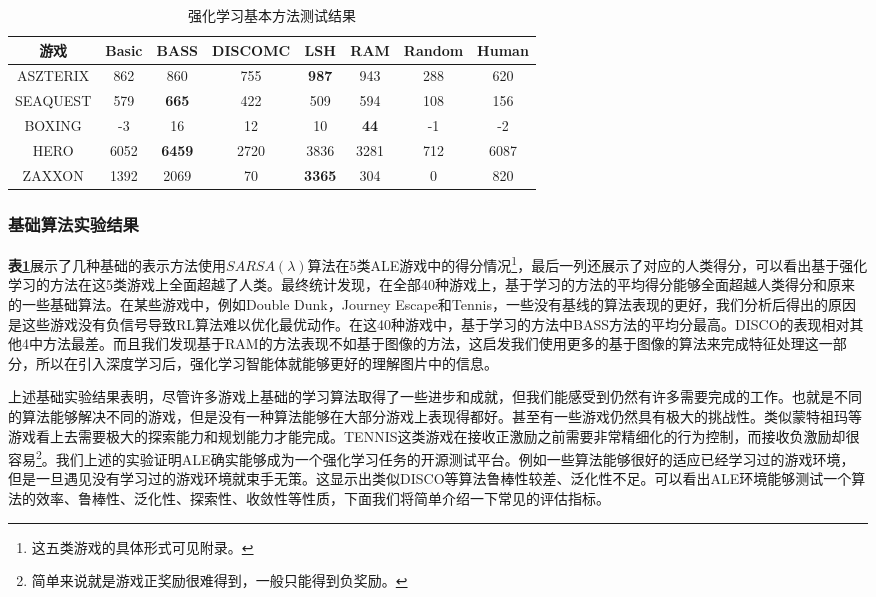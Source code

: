 \begin{table}[!tp]
    \caption{强化学习基本方法测试结果}
    
	\centering
	\begin{tabular}{c||c c c c c || c  c }
    \hline
    游戏&Basic & BASS & DISCOMC&LSH &RAM &Random  & Human\\
    \hline
    ASZTERIX    &   862     & 860        &      755 &\textbf{987}    &943    &288 & 620 \\
    SEAQUEST    &   579     & \textbf{665}        &      422 &509    &594    &108 & 156\\
    BOXING      &     -3    & 16         &      12  &10     &\textbf{44 }    &-1  & -2\\
    HERO        &     6052  & \textbf{6459}       &      2720&3836   &3281   &712 & 6087\\
    ZAXXON      & 1392      & 2069       &      70  &\textbf{3365}   &304    &0   & 820\\
    \hline
    \end{tabular}
    \label{Table: base rl performance on ale}
    
\end{table}



\subsubsection{基础算法实验结果}
\textbf{表\ref{Table: base rl performance on ale}}展示了几种基础的表示方法使用$SARSA(\lambda)$算法在5类ALE游戏中的得分情况\footnote{这五类游戏的具体形式可见附录。}，最后一列还展示了对应的人类得分，可以看出基于强化学习的方法在这5类游戏上全面超越了人类。最终统计发现，在全部40种游戏上，基于学习的方法的平均得分能够全面超越人类得分和原来的一些基础算法。在某些游戏中，例如Double Dunk，Journey Escape和Tennis，一些没有基线的算法表现的更好，我们分析后得出的原因是这些游戏没有负信号导致RL算法难以优化最优动作。在这40种游戏中，基于学习的方法中BASS方法的平均分最高。DISCO的表现相对其他4中方法最差。而且我们发现基于RAM的方法表现不如基于图像的方法，这启发我们使用更多的基于图像的算法来完成特征处理这一部分，所以在引入深度学习后，强化学习智能体就能够更好的理解图片中的信息。

上述基础实验结果表明，尽管许多游戏上基础的学习算法取得了一些进步和成就，但我们能感受到仍然有许多需要完成的工作。也就是不同的算法能够解决不同的游戏，但是没有一种算法能够在大部分游戏上表现得都好。甚至有一些游戏仍然具有极大的挑战性。类似蒙特祖玛等游戏看上去需要极大的探索能力和规划能力才能完成。TENNIS这类游戏在接收正激励之前需要非常精细化的行为控制，而接收负激励却很容易\footnote{简单来说就是游戏正奖励很难得到，一般只能得到负奖励。}。我们上述的实验证明ALE确实能够成为一个强化学习任务的开源测试平台。例如一些算法能够很好的适应已经学习过的游戏环境，但是一旦遇见没有学习过的游戏环境就束手无策。这显示出类似DISCO等算法鲁棒性较差、泛化性不足。可以看出ALE环境能够测试一个算法的效率、鲁棒性、泛化性、探索性、收敛性等性质，下面我们将简单介绍一下常见的评估指标。

